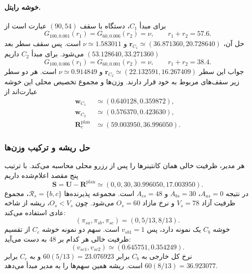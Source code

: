 \paragraph{خوشه رایتل.}
برای مبدأ $C_1$، دستگاه با سقف $(90,54)$ عبارت است از
\begin{equation}
 G_{100,0.001}(r_1)=G_{60,0.006}(r_2)=\nu,\qquad r_1+r_2=57.6.
\end{equation}
حل آن، $\boldsymbol r_{C_1}\simeq(36.871360,20.728640)$ و $\nu\simeq1.583011$ است. پس سقف سطر بعد $(53.128640,33.271360)$ می‌شود. برای مبدأ $C_2$ داریم
\begin{equation}
 G_{100,0.006}(r_1)=G_{60,0.001}(r_2)=\nu,\qquad r_1+r_2=38.4.
\end{equation}
جواب این سطر $\boldsymbol r_{C_2}\simeq(22.132591,16.267409)$ و $\nu\simeq0.914849$ است. هر دو سطر زیر سقف‌های مربوط به خود قرار دارند. وزن‌ها و مجموع تخصیص محلی این خوشه عبارت‌اند از
\begin{align}
 \boldsymbol w_{C_1}&\simeq(0.640128,0.359872),\\
 \boldsymbol w_{C_2}&\simeq(0.576370,0.423630),\\
 \boldsymbol R^{\mathrm{plan}}_c&\simeq(59.003950,36.996050).
\end{align}

\subsubsection{حل ریشه و ترکیب وزن‌ها}

هر مدیر، ظرفیت خالی همان کانتینرها را پس از رزرو محلی محاسبه می‌کند. با ترتیب پنج مقصد اعلام‌شده داریم
\begin{equation}
 \boldsymbol S=\boldsymbol U-\boldsymbol R^{\mathrm{plan}}
 \simeq(0,0,30,30.996050,17.003950).
\end{equation}
در نتیجه $A_{as}=0$، $A_{bs}=30$ و $A_{cs}=48$ است. مجموعه پذیرنده‌ها $\mathcal R_s=\{b,c\}$، مجموع ظرفیت آزاد $V_s=78$ و نرخ مازاد $O_s=60$ می‌شود. چون $O_s<V_s$، ریشه از شاخه عادی استفاده می‌کند:
\begin{equation}
 (\pi_{sa},\pi_{sb},\pi_{sc})=(0,5/13,8/13).
\end{equation}
خوشه $C_b$ یک نمونه دارد، پس $v_{sb1}=1$ است. سهم دو نمونه خوشه $C_c$ از تقسیم ظرفیت خالی هر کدام بر $48$ به دست می‌آید:
\begin{equation}
 (v_{sc1},v_{sc2})\simeq(0.645751,0.354249).
\end{equation}
نرخ کل خارجی به $C_b$ برابر $60(5/13)=23.076923$ و به $C_c$ برابر $60(8/13)=36.923077$ است. ریشه همین سهم‌ها را به مدیر مبدأ می‌دهد.

